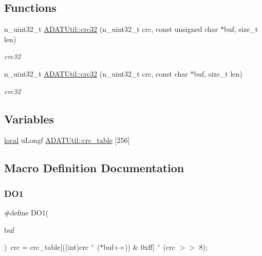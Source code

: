 \subsection*{Functions}
\begin{DoxyCompactItemize}
\item 
n\+\_\+uint32\+\_\+t \mbox{\hyperlink{namespaceADATUtil_a61372c5ac63a8bd3ce0aec8f04f386d9}{A\+D\+A\+T\+Util\+::crc32}} (n\+\_\+uint32\+\_\+t crc, const unsigned char $\ast$buf, size\+\_\+t len)
\begin{DoxyCompactList}\small\item\em crc32 \end{DoxyCompactList}\item 
n\+\_\+uint32\+\_\+t \mbox{\hyperlink{namespaceADATUtil_aea7a30b468249f17899ebbb9902fb330}{A\+D\+A\+T\+Util\+::crc32}} (n\+\_\+uint32\+\_\+t crc, const char $\ast$buf, size\+\_\+t len)
\begin{DoxyCompactList}\small\item\em crc32 \end{DoxyCompactList}\end{DoxyCompactItemize}
\subsection*{Variables}
\begin{DoxyCompactItemize}
\item 
\mbox{\hyperlink{adat__devel_2lib_2io_2adat__crc32_8cc_a08023ea6765c99d60a6a3840cd07156e}{local}} u\+Longf \mbox{\hyperlink{namespaceADATUtil_a3936457e43366b1c492c10870155ef6c}{A\+D\+A\+T\+Util\+::crc\+\_\+table}} \mbox{[}256\mbox{]}
\end{DoxyCompactItemize}


\subsection{Macro Definition Documentation}
\mbox{\label{adat-devel_2lib_2io_2adat__crc32_8cc_a6d5587d9c0724d87e000dec844eb48aa}} 
\subsubsection{\texorpdfstring{DO1}{DO1}}
{\footnotesize\ttfamily \#define D\+O1(\begin{DoxyParamCaption}\item[{}]{buf }\end{DoxyParamCaption})~crc = crc\+\_\+table\mbox{[}((int)crc $^\wedge$ ($\ast$buf++)) \& 0xff\mbox{]} $^\wedge$ (crc $>$$>$ 8);}

